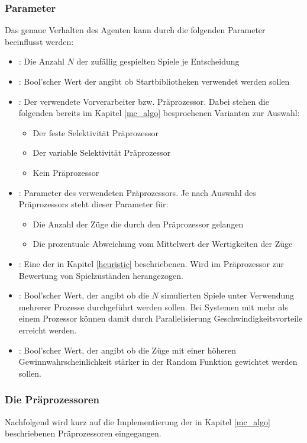 \subsubsection{Parameter}
\label{mc_params}
Das genaue Verhalten des Agenten kann durch die folgenden Parameter beeinflusst werden: 
\begin{itemize}
\item {}: Die Anzahl $N$ der zufällig gespielten Spiele je Entscheidung
\item {}: Bool'scher Wert der angibt ob Startbibliotheken verwendet werden sollen
\item {}: Der verwendete Vorverarbeiter bzw. Präprozessor. Dabei stehen die folgenden bereits im Kapitel \ref{mc_algo} besprochenen Varianten zur Auswahl:
\begin{itemize}
    \item Der feste Selektivität Präprozessor
    \item Der variable Selektivität Präprozessor
    \item Kein Präprozessor
\end{itemize}
\item {}: Parameter des verwendeten Präprozessors. Je nach Auswahl des Präprozessors steht dieser Parameter für:
\begin{itemize}
    \item Die Anzahl der Züge die durch den Präprozessor gelangen
    \item Die prozentuale Abweichung vom Mittelwert der Wertigkeiten der Züge
\end{itemize}
\item {}: Eine der in  Kapitel \ref{heuristic} beschriebenen. Wird im Präprozessor zur Bewertung von Spielzuständen herangezogen.
\item {}: Bool'scher Wert, der angibt ob die $N$ simulierten Spiele unter Verwendung mehrerer Prozesse durchgeführt werden sollen. Bei Systemen mit mehr als einem Prozessor können damit durch Parallelisierung Geschwindigkeitsvorteile erreicht werden. 
\item {}: Bool'scher Wert, der angibt ob die Züge mit einer höheren Gewinnwahrscheinlichkeit stärker in der Random Funktion gewichtet werden sollen.
\end{itemize}

\subsubsection{Die Präprozessoren}
Nachfolgend wird kurz auf die Implementierung der in Kapitel \ref{mc_algo} beschriebenen Präprozessoren eingegangen.
